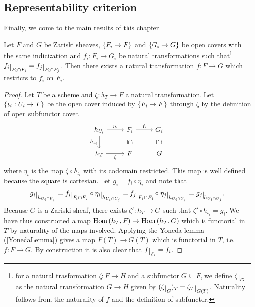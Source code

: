 \subsection{Representability criterion}
Finally, we come to the main results of this chapter

\begin{proposition}\label{MapGluingForZariskiSheaves}
Let $F$ and $G$ be Zariski sheaves, $\left\{{F_i\to F}\right\}$ and $\left\{{G_i\to G}\right\}$ be open covers with the same indicization and $f_i:F_i\to G_i$ be natural transformations such that\footnote{for a natural trasformation $\zeta:F\to H$ and a subfunctor $G\subseteq F$, we define $\zeta\res G$ as the natural transformation $G\to H$ given by $(\zeta\res G)_T=\zeta_T\res{G(T)}$. Naturality follows from the naturality of $f$ and the definition of subfunctor.} $f_i\res{F_i\cap F_j}=f_j\res{F_i\cap F_j}$. 
Then there exists a natural transformation $f:F\to G$ which restricts to $f_i$ on $F_i$.
\end{proposition}
\begin{proof}
Let $T$ be a scheme and $\zeta:h_T\to F$ a natural transformation. Let $\left\{{\iota_i:U_i\to T}\right\}$ be the open cover induced by $\left\{{F_i\to F}\right\}$ through $\zeta$ by the definition of open subfunctor cover.
\[\begin{tikzcd}
	{h_{U_i}} & {F_i} & {G_i} \\
	{h_T} & F & G
	\arrow["{\eta_i}", from=1-1, to=1-2]
	\arrow["{h_{\iota_i}}"', from=1-1, to=2-1]
	\arrow["\ulcorner"{anchor=center, pos=0.125}, draw=none, from=1-1, to=2-2]
	\arrow["{f_i}", from=1-2, to=1-3]
	\arrow["\subseteq"{marking, allow upside down}, draw=none, from=1-2, to=2-2]
	\arrow["\subseteq"{marking, allow upside down}, draw=none, from=1-3, to=2-3]
	\arrow["\zeta"', from=2-1, to=2-2]
\end{tikzcd}\]
where $\eta_i$ is the map $\zeta\circ h_{\iota_i}$ with its codomain restricted. This map is well defined because the square is cartesian.
Let $g_i=f_i\circ \eta_i$ and note that
\[g_i\res{h_{U_i\cap U_j}}=f_i\res{F_i\cap F_j}\circ \eta_i \res{h_{U_i\cap U_j}}=f_j\res{F_i\cap F_j}\circ \eta_j\res{h_{U_i\cap U_j}}=g_j\res{h_{U_i\cap U_j}}.\]
Because $G$ is a Zariski sheaf, there exists $\zeta':h_T\to G$ such that $\zeta'\circ h_{\iota_i}=g_i$. We have thus constructed a map $\mathrm{Hom}\,(h_T,F)\to \mathrm{Hom}\,(h_T,G)$ which is functorial in $T$ by naturality of the maps involved. Applying the Yoneda lemma (\ref{YonedaLemma}) gives a map $F(T)\to G(T)$ which is functorial in $T$, i.e. $f:F\to G$. By construction it is also clear that $f\res{F_i}=f_i$.
\end{proof}
